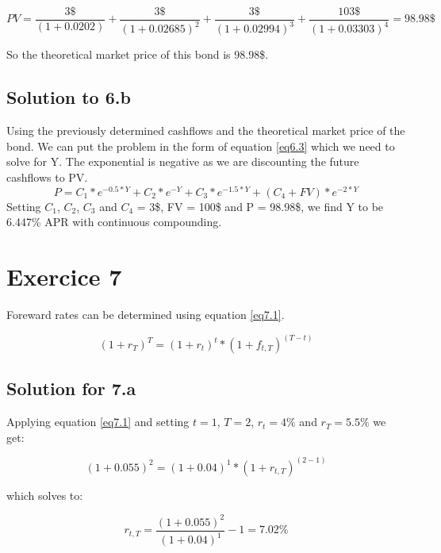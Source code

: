\documentclass[a4paper,11pt,twoside]{article}
\begin{document}
\begin{equation}
PV = \frac{3\$}{(1+0.0202)} + \frac{3\$}{(1+0.02685)^2} + \frac{3\$}{(1+0.02994)^3} + \frac{103\$}{(1+0.03303)^4} = 98.98\$
\end{equation}

So the theoretical market price of this bond is 98.98\$.

\subsection{Solution to 6.b}

Using the previously determined cashflows and the theoretical market price of the bond. We can put the problem in the form of equation \ref{eq6.3} which we need to solve for Y. The exponential is negative as we are discounting the future cashflows to PV. 
 \begin{equation}
\label{eq6.3}
P = C_1*e^{-0.5*Y} + C_2*e^{-Y} + C_3*e^{-1.5*Y} + (C_4 + FV)*e^{-2*Y}
\end{equation}
Setting $C_1$, $C_2$, $C_3$ and $C_4$ = 3\$, FV = 100\$ and P = 98.98\$, we find Y to be 6.447\% APR with continuous compounding. 

\section{Exercice 7}

Foreward rates can be determined using equation \ref{eq7.1}.

\begin{equation}
\label{eq7.1}
(1+r_T)^T = (1+r_t)^t*(1+f_{t,T})^{(T-t)}
\end{equation}


\subsection{Solution for 7.a}

Applying equation \ref{eq7.1} and setting $t = 1$, $T=2$, $r_t = 4\%$ and $r_T = 5.5\%$ we get:

\begin{equation}
(1+0.055)^2 = (1+0.04)^1*(1+r_{t,T})^{(2-1)}
\end{equation}

which solves to:

\begin{equation}
r_{t,T} = \frac{(1+0.055)^2}{(1+0.04)^1}-1 = 7.02\%
\end{equation}
\end{document}
